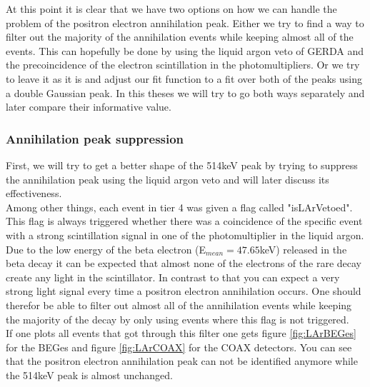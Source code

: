At this point it is clear that we have two options on how we can handle the problem of the positron electron annihilation peak. 
Either we try to find a way to filter out the majority of the annihilation events while keeping almost all of the  events. 
This can hopefully be done by using the liquid argon veto of GERDA and the precoincidence of the electron scintillation in the photomultipliers. 
Or we try to leave it as it is and adjust our fit function to a fit over both of the peaks using a double Gaussian peak. 
In this theses we will try to go both ways separately and later compare their informative value.
\\

\subsubsection{Annihilation peak suppression}
\label{sec:APS}

First, we will try to get a better shape of the 514keV peak by trying to suppress the annihilation peak using the liquid argon veto and will later discuss its effectiveness.
\\

Among other things, each event in tier 4 was given a flag called "isLArVetoed".
This flag is always triggered whether there was a coincidence of the specific event with a strong scintillation signal in one of the photomultiplier in the liquid argon. 
Due to the low energy of the beta electron (E\(_{mean}=47.65\)keV) released in the beta decay it can be expected that almost none of the electrons of the rare  decay create any light in the scintillator. 
In contrast to that you can expect a very strong light signal every time a positron electron annihilation occurs. 
One should therefor be able to filter out almost all of the annihilation events while keeping the majority of the  decay by only using events where this flag is not triggered.
\\

If one plots all events that got through this filter one gets figure \ref{fig:LArBEGes} for the BEGes and figure \ref{fig:LArCOAX} for the COAX detectors.
You can see that the positron electron annihilation peak can not be identified anymore while the 514keV peak is almost unchanged.
\\

